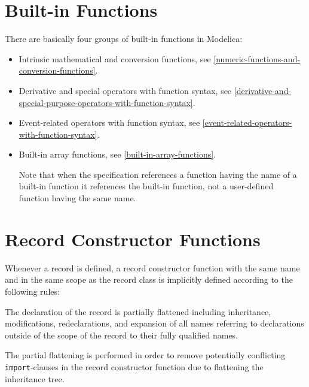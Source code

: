 \section{Built-in Functions}\label{built-in-functions}

There are basically four groups of built-in functions in Modelica:
\begin{itemize}
\item
  Intrinsic mathematical and conversion functions, see \cref{numeric-functions-and-conversion-functions}.
\item
  Derivative and special operators with function syntax,
  see \cref{derivative-and-special-purpose-operators-with-function-syntax}.
\item
  Event-related operators with function syntax, see \cref{event-related-operators-with-function-syntax}.
\item
  Built-in array functions, see \cref{built-in-array-functions}.

  Note that when the specification references a function having the name
  of a built-in function it references the built-in function, not a
  user-defined function having the same name.
\end{itemize}

\section{Record Constructor Functions}\label{record-constructor-functions}

Whenever a record is defined, a record constructor function with the same name and in the same scope as the record class is implicitly defined according to the following rules:

The declaration of the record is partially flattened including inheritance, modifications, redeclarations, and expansion of all names referring to declarations outside of the scope of the record to their fully qualified names.

\begin{nonnormative}
The partial flattening is performed in order to remove potentially conflicting \lstinline!import!-clauses in the record constructor function due to flattening the inheritance tree.
\end{nonnormative}

